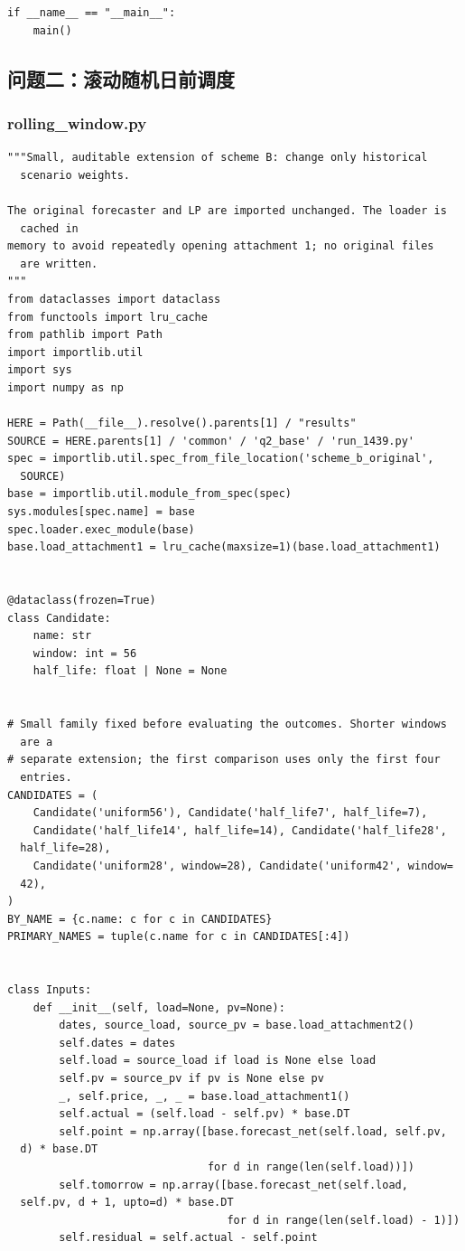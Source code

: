 \begin{verbatim}
if __name__ == "__main__":
    main()
\end{verbatim}

\subsection{问题二：滚动随机日前调度}

\subsubsection*{rolling\_window.py}
\begin{verbatim}
"""Small, auditable extension of scheme B: change only historical
  scenario weights.

The original forecaster and LP are imported unchanged. The loader is
  cached in
memory to avoid repeatedly opening attachment 1; no original files
  are written.
"""
from dataclasses import dataclass
from functools import lru_cache
from pathlib import Path
import importlib.util
import sys
import numpy as np

HERE = Path(__file__).resolve().parents[1] / "results"
SOURCE = HERE.parents[1] / 'common' / 'q2_base' / 'run_1439.py'
spec = importlib.util.spec_from_file_location('scheme_b_original',
  SOURCE)
base = importlib.util.module_from_spec(spec)
sys.modules[spec.name] = base
spec.loader.exec_module(base)
base.load_attachment1 = lru_cache(maxsize=1)(base.load_attachment1)


@dataclass(frozen=True)
class Candidate:
    name: str
    window: int = 56
    half_life: float | None = None


# Small family fixed before evaluating the outcomes. Shorter windows
  are a
# separate extension; the first comparison uses only the first four
  entries.
CANDIDATES = (
    Candidate('uniform56'), Candidate('half_life7', half_life=7),
    Candidate('half_life14', half_life=14), Candidate('half_life28',
  half_life=28),
    Candidate('uniform28', window=28), Candidate('uniform42', window=
  42),
)
BY_NAME = {c.name: c for c in CANDIDATES}
PRIMARY_NAMES = tuple(c.name for c in CANDIDATES[:4])


class Inputs:
    def __init__(self, load=None, pv=None):
        dates, source_load, source_pv = base.load_attachment2()
        self.dates = dates
        self.load = source_load if load is None else load
        self.pv = source_pv if pv is None else pv
        _, self.price, _, _ = base.load_attachment1()
        self.actual = (self.load - self.pv) * base.DT
        self.point = np.array([base.forecast_net(self.load, self.pv,
  d) * base.DT
                               for d in range(len(self.load))])
        self.tomorrow = np.array([base.forecast_net(self.load,
  self.pv, d + 1, upto=d) * base.DT
                                  for d in range(len(self.load) - 1)])
        self.residual = self.actual - self.point


\end{verbatim}
